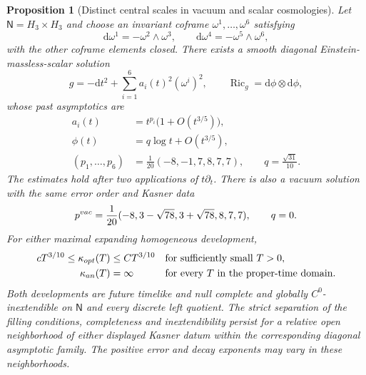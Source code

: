\documentclass[10pt,a4paper]{amsart}
\newtheorem{proposition}{Proposition}
\newcommand{\dd}{\mathrm d}
\begin{document}
\begin{proposition}[Distinct central scales in vacuum and scalar cosmologies]
\label{prop:einstein-optimal-separation}
Let $\mathsf N=H_3\times H_3$ and choose an invariant coframe
$\omega^1,\ldots,\omega^6$ satisfying
\[
 \dd\omega^1=-\omega^2\wedge\omega^3,\qquad
 \dd\omega^4=-\omega^5\wedge\omega^6,
\]
with the other coframe elements closed.  There exists a smooth
diagonal Einstein-massless-scalar solution
\[
 g=-\dd t^2+\sum_{i=1}^6 a_i(t)^2(\omega^i)^2,
 \qquad \operatorname{Ric}_g=\dd\phi\otimes\dd\phi,
\]
whose past asymptotics are
\begin{equation}
 \begin{split}
 a_i(t)&=t^{p_i}\bigl(1+O(t^{3/5})\bigr),\\
 \phi(t)&=q\log t+O(t^{3/5}),\\
 (p_1,\ldots,p_6)&=\frac1{20}(-8,-1,7,8,7,7),
 \qquad q=\frac{\sqrt{31}}{10}.
 \end{split}
 \label{eq:einstein-optimal-separation-data}
\end{equation}
The estimates hold after two applications of $t\partial_t$.
There is also a vacuum solution with the same error order and
Kasner data
\begin{equation}
 p^{\rm vac}=\frac1{20}
       (-8,3-\sqrt{78},3+\sqrt{78},8,7,7),\qquad q=0.
 \label{eq:vacuum-optimal-separation-data}
\end{equation}
For either maximal expanding homogeneous development,
\begin{align}
 cT^{3/10}\le\kappa_{\rm opt}(T)&\le C T^{3/10}
       &&\text{for sufficiently small }T>0,\notag\\
 \kappa_{\rm an}(T)&=\infty
       &&\text{for every }T\text{ in the proper-time domain}.
 \label{eq:einstein-optimal-separation}
\end{align}
Both developments are future timelike and null complete and globally
$C^0$-inextendible on $\mathsf N$ and every discrete left quotient.
The strict separation of the filling conditions, completeness and
inextendibility persist for a relative open neighborhood of either
displayed Kasner datum within the corresponding diagonal asymptotic
family.  The positive error and decay exponents may vary in these
neighborhoods.
\end{proposition}
\end{document}
